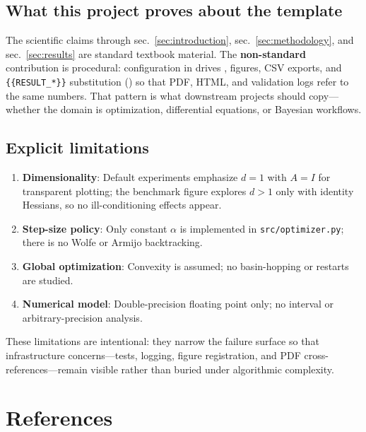 \documentclass[
]{article}
\providecommand{\tightlist}{%
  \setlength{\itemsep}{0pt}\setlength{\parskip}{0pt}}
\begin{document}
\subsection{What this project proves about the
template}\label{what-this-project-proves-about-the-template}

The scientific claims through sec.~\ref{sec:introduction},
sec.~\ref{sec:methodology}, and sec.~\ref{sec:results} are standard
textbook material. The \textbf{non-standard} contribution is procedural:
configuration in  drives
, figures, CSV exports, and
\texttt{\{\{RESULT\_*\}\}} substitution
() so that PDF,
HTML, and validation logs refer to the same numbers. That pattern is
what downstream projects should copy---whether the domain is
optimization, differential equations, or Bayesian workflows.

\subsection{Explicit limitations}\label{explicit-limitations}

\begin{enumerate}
\def\labelenumi{\arabic{enumi}.}
\tightlist
\item
  \textbf{Dimensionality}: Default experiments emphasize \(d = 1\) with
  \(A = I\) for transparent plotting; the benchmark figure explores
  \(d > 1\) only with identity Hessians, so no ill-conditioning effects
  appear.
\item
  \textbf{Step-size policy}: Only constant \(\alpha\) is implemented in
  \texttt{src/optimizer.py}; there is no Wolfe or Armijo backtracking.
\item
  \textbf{Global optimization}: Convexity is assumed; no basin-hopping
  or restarts are studied.
\item
  \textbf{Numerical model}: Double-precision floating point only; no
  interval or arbitrary-precision analysis.
\end{enumerate}

These limitations are intentional: they narrow the failure surface so
that infrastructure concerns---tests, logging, figure registration, and
PDF cross-references---remain visible rather than buried under
algorithmic complexity.

\newpage

\section{References}\label{sec:references}
\end{document}
